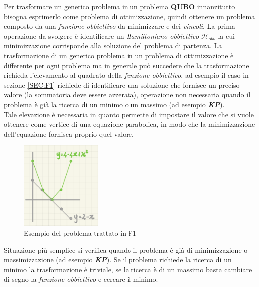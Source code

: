 \documentclass[a4paper]{article}
\newcommand{\imp}[1]{\textbf{\textit{#1}}}
\begin{document}
Per trasformare un generico problema in un problema \textbf{QUBO} innanzitutto bisogna esprimerlo come problema di ottimizzazione, quindi ottenere un problema composto da una \textit{funzione obbiettivo} da minimizzare e dei \textit{vincoli}.
La prima operazione da svolgere è identificare un \textit{Hamiltoniano obbiettivo} $\mathcal{H}_{obb}$ la cui minimizzazione corrisponde alla soluzione del problema di partenza.
La trasformazione di un generico problema in un problema di ottimizzazione è differente per ogni problema ma in generale può succedere che la trasformazione richieda l'elevamento al quadrato della \textit{funzione obbiettivo}, ad esempio il caso in sezione \ref{SEC:F1} richiede di identificare una soluzione che fornisce un preciso valore (la sommatoria deve essere azzerata), operazione non necessaria quando il problema è già la ricerca di un minimo o un massimo (ad esempio \imp{KP}).\\
Tale elevazione è necessaria in quanto permette di impostare il valore che si vuole ottenere come vertice di una equazione parabolica, in modo che la minimizzazione dell'equazione fornisca proprio quel valore.\\
\begin{figure}[!ht]
                \centering
                \includegraphics[width = 0.35\textwidth]{./img/F1.png}
                \caption{Esempio del problema trattato in F1} \label{FIG:F1_2}
\end{figure}
Situazione più semplice si verifica quando il problema è già di minimizzazione o massimizzazione (ad esempio \imp{KP}).
Se il problema richiede la ricerca di un minimo la trasformazione è triviale, se la ricerca è di un massimo basta cambiare di segno la \textit{funzione obbiettivo} e cercare il minimo.\\
\end{document}
